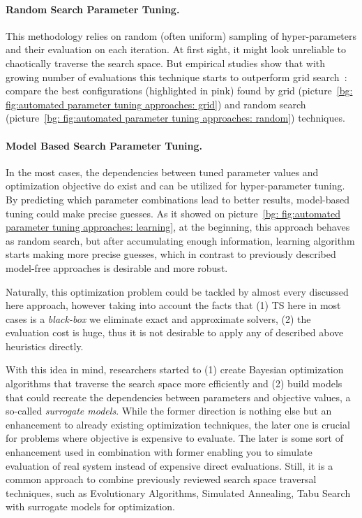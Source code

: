 \paragraph{Random Search Parameter Tuning.} This methodology relies on random (often uniform) sampling of hyper-parameters and their evaluation on each iteration. At first sight, it might look unreliable to chaotically traverse the search space. But empirical studies show that with growing number of evaluations this technique starts to outperform grid search~\cite{bergstra2012random}: compare the best configurations (highlighted in pink) found by grid (picture~\ref{bg: fig:automated parameter tuning approaches: grid}) and random search (picture~\ref{bg: fig:automated parameter tuning approaches: random}) techniques.

\paragraph{Model Based Search Parameter Tuning.} In the most cases, the dependencies between tuned parameter values and optimization objective do exist and can be utilized for hyper-parameter tuning. By predicting which parameter combinations lead to better results, model-based tuning could make precise guesses. As it showed on picture~\ref{bg: fig:automated parameter tuning approaches: learning}, at the beginning, this approach behaves as random search, but after accumulating enough information, learning algorithm starts making more precise guesses, which in contrast to previously described model-free approaches is desirable and more robust.

Naturally, this optimization problem could be tackled by almost every discussed here approach, however taking into account the facts that (1) TS here in most cases is a \textit{black-box} we eliminate exact and approximate solvers, (2) the evaluation cost is huge, thus it is not desirable to apply any of described above heuristics directly.

With this idea in mind, researchers started to (1) create  Bayesian optimization algorithms that traverse the search space more efficiently and (2) build models that could recreate the dependencies between parameters and objective values, a so-called \textit{surrogate models}. While the former direction is nothing else but an enhancement to already existing optimization techniques, the later one is crucial for problems where objective is expensive to evaluate.
The later is some sort of enhancement used in combination with former enabling you to simulate evaluation of real system instead of expensive direct evaluations. Still, it is a common approach to combine previously reviewed search space traversal techniques, such as Evolutionary Algorithms, Simulated Annealing, Tabu Search with surrogate models for optimization.


